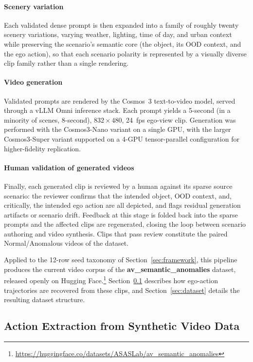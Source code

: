 \documentclass[conference]{IEEEtran}
\begin{document}
\paragraph{Scenery variation} Each validated dense prompt is then expanded into a family of roughly twenty scenery variations, varying weather, lighting, time of day, and urban context while preserving the scenario's semantic core (the object, its OOD context, and the ego action), so that each scenario polarity is represented by a visually diverse clip family rather than a single rendering.

\paragraph{Video generation} Validated prompts are rendered by the Cosmos~3 text-to-video model, served through a vLLM Omni inference stack. Each prompt yields a 5-second (in a minority of scenes, 8-second), $832\times480$, 24~fps ego-view clip. Generation was performed with the Cosmos3-Nano variant on a single GPU, with the larger Cosmos3-Super variant supported on a 4-GPU tensor-parallel configuration for higher-fidelity replication.

\paragraph{Human validation of generated videos} Finally, each generated clip is reviewed by a human against its sparse source scenario: the reviewer confirms that the intended object, OOD context, and, critically, the intended ego action are all depicted, and flags residual generation artifacts or scenario drift. Feedback at this stage is folded back into the sparse prompts and the affected clips are regenerated, closing the loop between scenario authoring and video synthesis. Clips that pass review constitute the paired Normal/Anomalous videos of the dataset.

Applied to the 12-row seed taxonomy of Section~\ref{sec:framework}, this pipeline produces the current video corpus of the \textbf{av\_semantic\_anomalies} dataset, released openly on Hugging Face.\footnote{\url{https://huggingface.co/datasets/ASASLab/av_semantic_anomalies}} Section~\ref{sec:action} describes how ego-action trajectories are recovered from these clips, and Section~\ref{sec:dataset} details the resulting dataset structure.

\subsection{Action Extraction from Synthetic Video Data}\label{sec:action}
\end{document}
